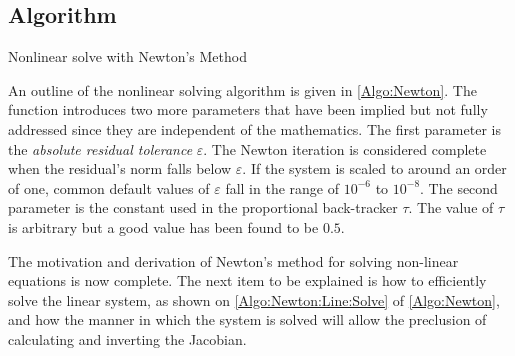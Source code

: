 \documentclass[12pt]{../UWMadThesis}
\begin{document}
\subsection{Algorithm}

\begin{algorithm}[t]
    \caption{Nonlinear solve with Newton's Method}
    \label{Algo:Newton}
\end{algorithm}

An outline of the nonlinear solving algorithm is given in \cref{Algo:Newton}.
The function introduces two more parameters that have been implied but not fully addressed since they are independent of the mathematics.
The first parameter is the \textit{absolute residual tolerance} $\varepsilon$.
The Newton iteration is considered complete when the residual's norm falls below $\varepsilon$.
If the system is scaled to around an order of one, common default values of $\varepsilon$ fall in the range of $10^{-6}$ to $10^{-8}$.
The second parameter is the constant used in the proportional back-tracker $\tau$.
The value of $\tau$ is arbitrary but a good value has been found to be $0.5$.

The motivation and derivation of Newton's method for solving non-linear equations is now complete.
The next item to be explained is how to efficiently solve the linear system, as shown on \cref{Algo:Newton:Line:Solve} of \cref{Algo:Newton}, and how the manner in which the system is solved will allow the preclusion of calculating and inverting the Jacobian.
\end{document}
